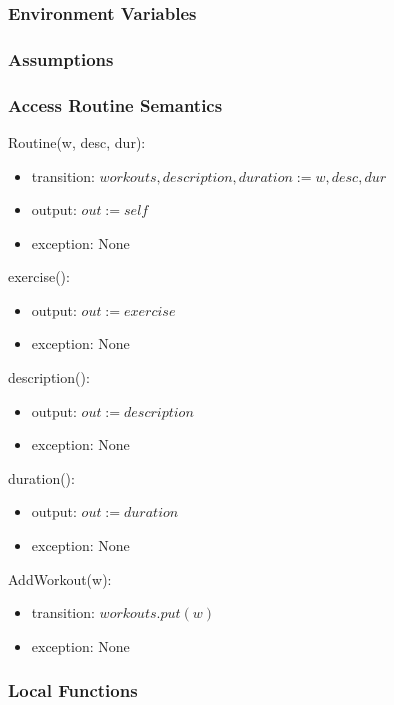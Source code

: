 \documentclass[12pt, titlepage]{article}
\begin{document}
\subsubsection{Environment Variables}

\subsubsection{Assumptions}

\subsubsection{Access Routine Semantics}

Routine(w, desc, dur):
\begin{itemize}
	\item transition: $workouts, description, duration := w, desc, dur$
	\item output: $out := self$
	\item exception: None
\end{itemize}

exercise():
\begin{itemize}
	\item output: $out := exercise$
	\item exception: None
\end{itemize}

description():
\begin{itemize}
	\item output: $out := description$
	\item exception: None
\end{itemize}

duration():
\begin{itemize}
	\item output: $out := duration$
	\item exception: None
\end{itemize}

AddWorkout(w):
\begin{itemize}
	\item transition: $workouts.put(w)$
	\item exception: None
\end{itemize}

\subsubsection{Local Functions}

\newpage
\end{document}
